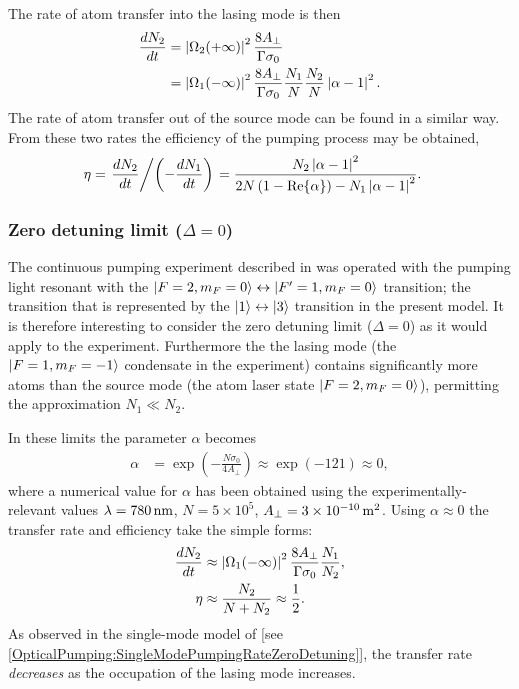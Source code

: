 The rate of atom transfer into the lasing mode is then
\begin{align}
    \frac{d N_2}{dt} &= \abs{\Omega_2(+\infty)}^2 \frac{8 A_\perp}{\Gamma \sigma_0} \\
     &= \abs{\Omega_1(-\infty)}^2 \frac{8 A_\perp}{\Gamma \sigma_0} \frac{N_1}{N} \frac{N_2}{N} \abs{\alpha - 1}^2. \label{OpticalPumping:OverlappingCondensates:TransferRate}
\end{align}
The rate of atom transfer out of the source mode can be found in a similar way.  From these two rates the efficiency of the pumping process may be obtained,
\begin{align}
    \eta &= \left.\frac{d N_2}{d t} \middle / \left(- \frac{d N_1}{dt}\right)\right. = \frac{N_2 \left|\alpha - 1\right|^2}{2 N \left(1 - \operatorname{Re}\{\alpha\}\right) - N_1 \left|\alpha -1\right|^2}.
\end{align}

\subsubsection{Zero detuning limit ($\Delta = 0$)}

The continuous pumping experiment described in  was operated with the pumping light resonant with the ${\left|F=2, m_F=0\right>} \leftrightarrow {\ensuremath{\left|F'=1, m_F=0\right>}}$ transition; the transition that is represented by the ${\left|1\right>} \leftrightarrow {\ensuremath{\left|3\right>}}$ transition in the present model.  It is therefore interesting to consider the zero detuning limit ($\Delta = 0$) as it would apply to the experiment.  Furthermore the the lasing mode (the ${\left|F=1, m_F=-1\right>}$ condensate in the experiment) contains significantly more atoms than the source mode (the atom laser state ${\left|F=2, m_F=0\right>}$), permitting the approximation $N_1 \ll N_2$.  

In these limits the parameter $\alpha$ becomes
\begin{align}
    \alpha &= \exp\left( - \frac{N \sigma_0}{4 A_\perp}\right) \approx \exp(- 121) \approx 0,
\end{align}
where a numerical value for $\alpha$ has been obtained using the experimentally-relevant values $\lambda = \unit[780]{nm}$, $N = 5 \times 10^5$, $A_\perp = 3\times\unit[10^{-10}]{m\textsuperscript{2}}$.  Using $\alpha \approx 0$ the transfer rate and efficiency take the simple forms:
\begin{align}
    \frac{d N_2}{dt} &\approx \abs{\Omega_1(-\infty)}^2 \frac{8 A_\perp}{\Gamma \sigma_0} \frac{N_1}{N_2}, \label{OpticalPumping:OverlappingCondensates:ZeroDetuningTransferRate}\\
    \eta &\approx \frac{N_2}{N + N_2} \approx \frac{1}{2} \label{OpticalPumping:OverlappingCondensates:ZeroDetuningEfficiency}.
\end{align}
As observed in the single-mode model of  [see \eqref{OpticalPumping:SingleModePumpingRateZeroDetuning}], the transfer rate \emph{decreases} as the occupation of the lasing mode increases.  

